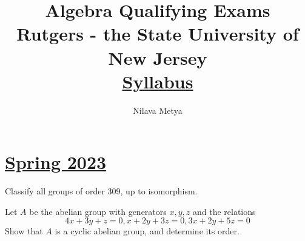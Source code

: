 
\usepackage{quiver}
\usepackage{listings}
\usepackage{fancyvrb,xcolor}
\usepackage{tcolorbox}
\usepackage{tabto}
\usepackage{wrapfig}
\newcommand{\catname}[1]{{\normalfont\textbf{#1}}}
\newcommand{\Set}{\catname{\sffamily Set }}
\newcommand{\Ring}{\catname{\sffamily Ring }}
\newcommand{\Group}{\catname{\sffamily Group }}
\newcommand{\pb}[2]{
\begin{tcolorbox}[
width=\textwidth,
colback={skybl},
title={#1},
]  
#2
\end{tcolorbox} 
}
\newcommand{\w}{\wedge}
\title{\vspace{-1in}\textbf{Algebra Qualifying Exams}\\
{\large{Rutgers - the State University of New Jersey}}\\
{\small{\href{https://www.math.rutgers.edu/docman-lister/math-main/academics/graduate/qualifying-exam/1266-syl2014/file}{Syllabus}
}}}


\author{\vspace{-2in}Nilava Metya}
\date{\vspace{-0.2in}}


\maketitle
\tableofcontents
\newpage



\section*{\href{https://www.math.rutgers.edu/docman-lister/math-main/2630-wq-jan-2023-all-3/file}{Spring 2023}}
\pb{Groups}{ 
Classify all groups of order 309, up to isomorphism.
}




\pb{Groups}{ 
Let $A$ be the abelian group with generators $x,y,z$ and the relations
$$4x+3y+z=0, x+2y+3z=0, 3x+2y+5z=0$$ Show that $A$ is a cyclic abelian group, and determine its order.
}


